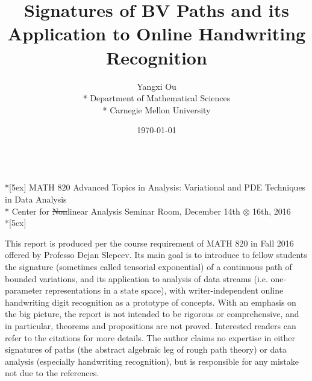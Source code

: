 \documentclass[fleqn]{article}
\title{Signatures of BV Paths and its Application to Online Handwriting Recognition}
\author{Yangxi Ou \\* Department of Mathematical Sciences \\* Carnegie Mellon University}
\date{\today}
\theoremstyle{definition}
\theoremstyle{remark}
\begin{document}
\begin{center}	
	\textbf{\Large \thetitle} \\*[5ex]
	MATH 820 Advanced Topics in Analysis: Variational and PDE Techniques in Data Analysis \\*
    Center for \sout{Non}linear Analysis Seminar Room, December 14th $\otimes$ 16th, 2016 \\*[5ex]
\end{center}

This report is produced per the course requirement of MATH 820 in Fall 2016 offered by Professo Dejan Slepcev. Its main goal is to introduce to fellow students the signature (sometimes called tensorial exponential) of a continuous path of bounded variations, and its application to analysis of data streams (i.e. one-parameter representations in a state space), with writer-independent online handwriting digit recognition as a prototype of concepts. With an emphasis on the big picture, the report is not intended to be rigorous or comprehensive, and in particular, theorems and propositions are not proved. Interested readers can refer to the citations for more details. The author claims no expertise in either signatures of paths (the abstract algebraic leg of rough path theory) or data analysis (especially handwriting recognition), but is responsible for any mistake not due to the references.

\begin{center}
    \tableofcontents
\end{center}

\vspace{10ex}

\doublespacing

\end{document}

